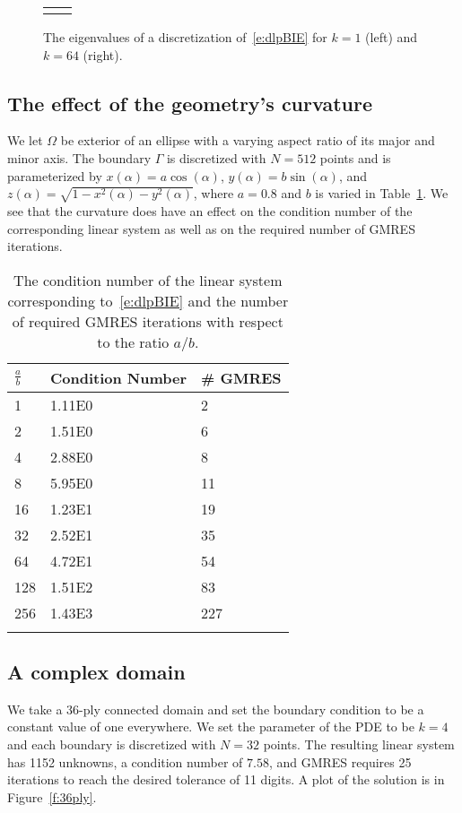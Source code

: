 \begin{figure}[htps]
\centering
\begin{tabular}{cc}
 &

\end{tabular}
\caption{\label{f:evalues} The eigenvalues of a discretization
of~\eqref{e:dlpBIE} for $k=1$ (left) and $k=64$ (right).}
\end{figure}


\subsection{The effect of the geometry's curvature}
We let $\Omega$ be exterior of an ellipse with a varying aspect ratio
of its major and minor axis.  The boundary $\Gamma$ is discretized with
$N=512$ points and is parameterized by $x(\alpha) = a\cos(\alpha)$,
$y(\alpha) = b\sin(\alpha)$, and $z(\alpha) =
\sqrt{1-x^{2}(\alpha)-y^{2}(\alpha)}$, where $a = 0.8$ and $b$ is
varied in Table~\ref{t:example3}.  We see that the curvature does have
an effect on the condition number of the corresponding linear system as
well as on the required number of GMRES iterations.

\begin{table}[htps]
\caption{\label{t:example3} The condition number of the linear system
corresponding to~\eqref{e:dlpBIE} and the number of required GMRES
iterations with respect to the ratio $a/b$.}
\centering
\begin{tabular*}{0.8\textwidth}{@{\extracolsep{\fill}}lll}
$\frac{a}{b}$ & Condition Number & \# GMRES \\
\hline\noalign{\smallskip}
1   & 1.11E0 & 2   \\ 
2   & 1.51E0 & 6   \\
4   & 2.88E0 & 8   \\
8   & 5.95E0 & 11  \\
16  & 1.23E1 & 19  \\
32  & 2.52E1 & 35  \\
64  & 4.72E1 & 54  \\
128 & 1.51E2 & 83  \\
256 & 1.43E3 & 227 \\
\noalign{\smallskip}\hline
\end{tabular*}
\end{table}


\subsection{A complex domain}
We take a 36-ply connected domain and set the boundary condition to be a
constant value of one everywhere.  We set the parameter of the PDE to be
$k=4$ and each boundary is discretized with $N=32$ points.  The
resulting linear system has 1152 unknowns, a condition number of $7.58$,
and GMRES requires 25 iterations to reach the desired tolerance of 11
digits.  A plot of the solution is in Figure~\ref{f:36ply}.

